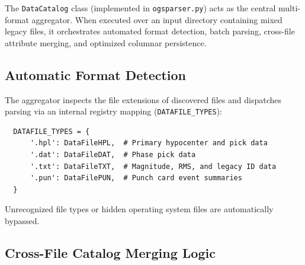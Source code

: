 The \texttt{DataCatalog} class (implemented in
\texttt{ogsparser.py}) acts as the central multi-format
aggregator. When executed over an input directory containing mixed
legacy files, it orchestrates automated format detection, batch
parsing, cross-file attribute merging, and optimized columnar persistence.

\subsection{Automatic Format Detection}
\label{subsec:format_detection}

The aggregator inspects the file extensions of discovered files
and dispatches parsing via an internal registry mapping
(\texttt{DATAFILE\_TYPES}):
\begin{verbatim}
  DATAFILE_TYPES = {
      '.hpl': DataFileHPL,  # Primary hypocenter and pick data
      '.dat': DataFileDAT,  # Phase pick data
      '.txt': DataFileTXT,  # Magnitude, RMS, and legacy ID data
      '.pun': DataFilePUN,  # Punch card event summaries
  }
\end{verbatim}
Unrecognized file types or hidden operating system files are
automatically bypassed.

\subsection{Cross-File Catalog Merging Logic}
\label{subsec:merge_logic}

